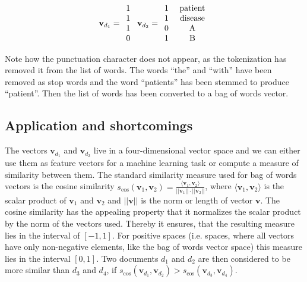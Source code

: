 \[
\textbf{v}_{d_1}=\begin{array}{c}
1\\
1\\
1\\
0
\end{array}\ \textbf{v}_{d_2}=\begin{array}{c}
1\\
1\\
0\\
1
\end{array}\ \begin{array}{c}
\rm{patient}\\
\rm{disease}\\
\rm{A}\\
\rm{B}\\
\end{array}
\]

Note how the punctuation character does not appear, as the tokenization has removed it from the list of words. The words ``the'' and ``with'' have been removed as stop words and the word ``patients'' has been stemmed to produce ``patient''. Then the list of words has been converted to a bag of words vector.

\subsection*{Application and shortcomings}
The vectors $\textbf{v}_{d_1}$ and $\textbf{v}_{d_2}$ live in a four-dimensional vector space and we can either use them as feature vectors for a machine learning task or compute a measure of similarity between them. The standard similarity measure used for bag of words vectors is the cosine similarity $s_{\cos}(\textbf{v}_1, \textbf{v}_2)=\frac{\langle\textbf{v}_1,\textbf{v}_2\rangle}{||\textbf{v}_1||\cdot ||\textbf{v}_2||}$, where $\langle\textbf{v}_1,\textbf{v}_2\rangle$ is the scalar product of $\textbf{v}_1$ and $\textbf{v}_2$ and $||\textbf{v}||$ is the norm or length of vector $\textbf{v}$. The cosine similarity has the appealing property that it normalizes the scalar product by the norm of the vectors used. Thereby it ensures, that the resulting measure lies in the interval of $[-1,1]$. For positive spaces (i.e. spaces, where all vectors have only non-negative elements, like the bag of words vector space) this measure lies in the interval $[0,1]$. Two documents $d_{1}$ and $d_{2}$ are then considered to be more similar than $d_{3}$ and $d_{4}$, if $s_{\cos}(\textbf{v}_{d_1}, \textbf{v}_{d_2}) > s_{\cos}(\textbf{v}_{d_3}, \textbf{v}_{d_4})$.

